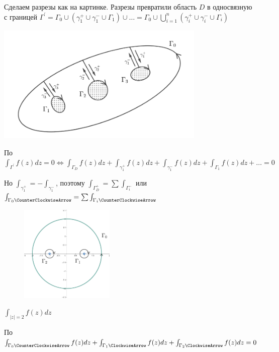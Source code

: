 \documentclass[12pt]{article}
\begin{document}
\begin{MyProof}
    Сделаем разрезы как на картинке. 
    Разрезы превратили область $D$ в односвязную с границей $\Gamma^\prime = \Gamma_0 \cup (\gamma_1^+ \cup \gamma_1^- \cup \Gamma_1) \cup \dots = \Gamma_0 \cup \bigcup_{i = 1}^n (\gamma_i^+ \cup \gamma_i^- \cup \Gamma_i)$

    \begin{center}
        \includegraphics[width=10cm]{addchapters2/images/addchapters2_2025_04_04_3}
    \end{center}

    По  $\int_{\Gamma^\prime} f(z) dz = 0 \Longleftrightarrow \int_{\Gamma_D} f(z) dz + \int_{\gamma^+_1} f(z) dz + \int_{\gamma^-_1} f(z) dz + \int_{\Gamma_1} f(z) dz + \dots = 0$

    Но $\int_{\gamma_1^+} = - \int_{\gamma_1^-}$, поэтому $\int_{\Gamma_D^+} = \sum \int_{\Gamma_i^-}$ или $\int_{\Gamma_0 \CounterClockwiseArrow} = \sum \int_{\Gamma_i \CounterClockwiseArrow}$
\end{MyProof}


\begin{figure}
    \includegraphics[width=4.5cm]{addchapters2/images/addchapters2_2025_04_04_4}
\end{figure}

\Ex $\int_{|z| = 2} f(z) dz$

По  $\int_{\Gamma_0 \CounterClockwiseArrow} f(z) dz + \int_{\Gamma_1 \ClockwiseArrow} f(z) dz + \int_{\Gamma_2 \ClockwiseArrow} f(z) dz = 0$
\end{document}
